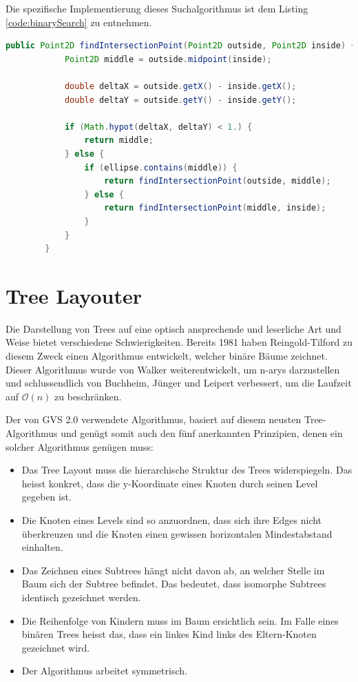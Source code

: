 \documentclass[11pt,a4paper,english,oneside]{book}
\numberwithin{equation}{chapter}
\begin{document}
	\clearpage
	\noindent
	Die spezifische Implementierung dieses Suchalgorithmus ist dem Listing \ref{code:binarySearch} zu entnehmen.
	
	\begin{lstlisting}[language=java, frame=single,caption={Algorithmus Schnittpunkt Suche}, label={code:binarySearch}]
		public Point2D findIntersectionPoint(Point2D outside, Point2D inside) {
			Point2D middle = outside.midpoint(inside);
		
			double deltaX = outside.getX() - inside.getX();
			double deltaY = outside.getY() - inside.getY();
		
			if (Math.hypot(deltaX, deltaY) < 1.) {
				return middle;
			} else {
				if (ellipse.contains(middle)) {
					return findIntersectionPoint(outside, middle);
				} else {
					return findIntersectionPoint(middle, inside);
				}
			}
		}
	\end{lstlisting}



	\section{Tree Layouter} \label{sec:treelayouter}

	Die Darstellung von Trees auf eine optisch ansprechende und leserliche Art und Weise bietet verschiedene Schwierigkeiten. Bereits 1981 haben Reingold-Tilford \cite{reingold-tilford} zu diesem Zweck einen Algorithmus entwickelt, welcher binäre Bäume zeichnet. Dieser Algorithmus wurde von Walker weiterentwickelt, um \gls{n-ary}s darzustellen und schlussendlich von Buchheim, Jünger und Leipert \cite{tree-algorithm} verbessert, um die Laufzeit auf $\mathcal{O}(n)$ zu beschränken. 
	
	Der von GVS 2.0 verwendete Algorithmus, basiert auf diesem neusten Tree-Algorithmus und genügt somit auch den fünf anerkannten Prinzipien, denen ein solcher Algorithmus genügen muss:
	
	\begin{itemize}
		\item Das Tree Layout muss die hierarchische Struktur des Trees widerspiegeln. Das heisst konkret, dass die y-Koordinate eines Knoten durch seinen Level gegeben ist.
		\item Die Knoten eines Levels sind so anzuordnen, dass sich ihre Edges nicht überkreuzen und die Knoten einen gewissen horizontalen Mindestabstand einhalten.
		\item Das Zeichnen eines Subtrees hängt nicht davon ab, an welcher Stelle im Baum sich der Subtree befindet. Das bedeutet, dass \gls{isomorph}e Subtrees identisch gezeichnet werden.
		\item Die Reihenfolge von Kindern muss im Baum ersichtlich sein. Im Falle eines binären Trees heisst das, dass ein linkes Kind links des Eltern-Knoten gezeichnet wird.
		\item Der Algorithmus arbeitet symmetrisch.
	\end{itemize}
	
\end{document}
